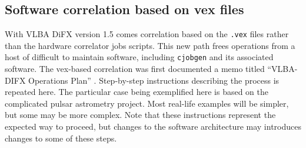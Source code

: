 %
%
%
%



\subsection{Software correlation based on vex files}

With VLBA DiFX version 1.5 comes correlation based on the {\tt .vex} files rather than the hardware correlator jobs scripts.
This new path frees operations from a host of difficult to maintain software, including {\tt cjobgen} and its associated software.
The vex-based correlation was first documented a memo titled ``VLBA-DIFX Operations Plan'' \cite{opsplan}.
Step-by-step instructions describing the process is repeated here.
The particular case being exemplified here is based on the complicated pulsar astrometry project.
Most real-life examples will be simpler, but some may be more complex.
Note that these instructions represent the expected way to proceed, but changes to the software architecture may introduces changes to some of these steps.

